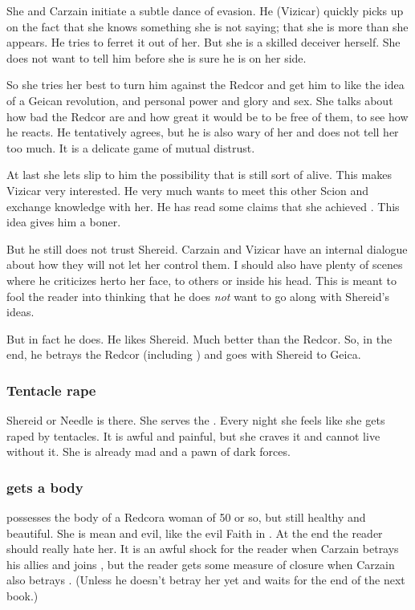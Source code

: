 She and Carzain initiate a subtle dance of evasion. 
He (Vizicar) quickly picks up on the fact that she knows something she is not saying; that she is more than she appears. 
He tries to ferret it out of her. 
But she is a skilled deceiver herself. 
She does not want to tell him before she is sure he is on her side. 

So she tries her best to turn him against the Redcor and get him to like the idea of a Geican revolution, and personal power and glory and sex. 
She talks about how bad the Redcor are and how great it would be to be free of them, to see how he reacts. 
He tentatively agrees, but he is also wary of her and does not tell her too much. 
It is a delicate game of mutual distrust. 

At last she lets slip to him the possibility that \Belzir{} is still sort of alive. 
This makes Vizicar very interested. 
He very much wants to meet this other Scion and exchange knowledge with her. 
He has read some claims that she achieved \apotheosis. 
This idea gives him a boner. 

But he still does not trust Shereid. 
Carzain and Vizicar have an internal dialogue about how they will not let her control them. 
I should also have plenty of scenes where he criticizes her\dash to her face, to others or inside his head. 
This is meant to fool the reader into thinking that he does \emph{not} want to go along with Shereid's ideas. 

But in fact he does. 
He likes Shereid. 
Much better than the Redcor. 
So, in the end, he betrays the Redcor (including \Racel) and goes with Shereid to Geica. 





\subsubsection{Tentacle rape}
Shereid or Needle is there. 
She serves the \banes.
Every night she feels like she gets raped by tentacles. 
It is awful and painful, but she craves it and cannot live without it.
She is already mad and a pawn of dark forces. 





\subsubsection{\Belzir gets a body}
\Belzir possesses the body of a Redcor\dash a woman of 50 or so, but still healthy and beautiful. 
She is mean and evil, like the evil Faith in \cite[season 3]{TV:Buffy}. 
At the end the reader should really hate her. 
It is an awful shock for the reader when Carzain betrays his allies and joins \Belzir, but the reader gets some measure of closure when Carzain also betrays \Belzir. 
(Unless he doesn't betray her yet and waits for the end of the next book.)









